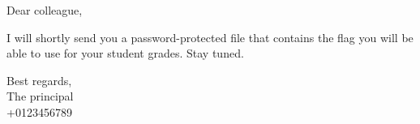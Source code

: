 \documentclass[margin=1cm,varwidth]{standalone}
\begin{document}
Dear colleague,

\vspace{1em}

I will shortly send you a password-protected file that contains the flag you will be able to use for your student grades. Stay tuned.

\noindent
Best regards,\\[1em]
The principal\\
+0123456789
\end{document}

